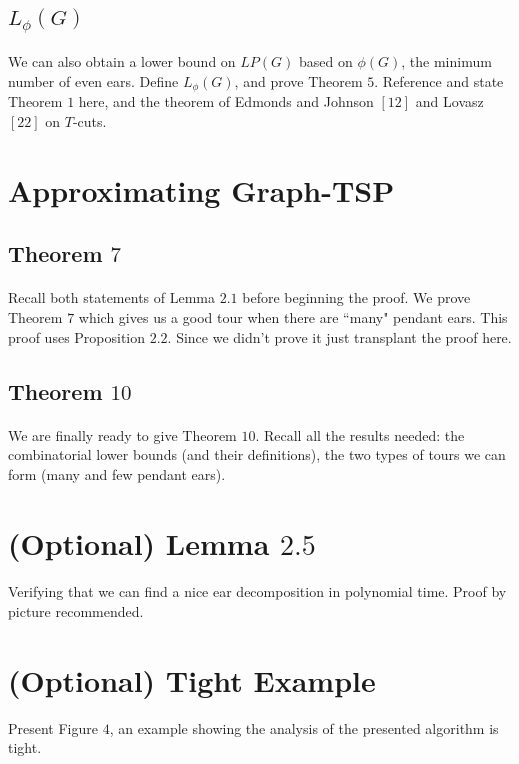 \documentclass[letterpaper,12pt,oneside,onecolumn]{article}
\begin{document}
\subsection{$L_\phi(G)$}
\paragraph{}
We can also obtain a lower bound on $LP(G)$ based on $\phi(G)$, the minimum number of even ears. Define $L_\phi(G)$, and prove Theorem $5$. Reference and state Theorem $1$ here, and the theorem of Edmonds and Johnson $[12]$ and Lovasz $[22]$ on $T$-cuts.
\section{Approximating Graph-TSP}
\subsection{Theorem $7$}
\paragraph{}
Recall both statements of Lemma $2.1$ before beginning the proof. We prove Theorem $7$ which gives us a good tour when there are ``many" pendant ears. This proof uses Proposition $2.2$. Since we didn't prove it just transplant the proof here.
\subsection{Theorem $10$}
\paragraph{}
We are finally ready to give Theorem $10$. Recall all the results needed: the combinatorial lower bounds (and their definitions), the two types of tours we can form (many and few pendant ears).
\section{(Optional) Lemma $2.5$}
\paragraph{}
Verifying that we can find a nice ear decomposition in polynomial time. Proof by picture recommended.
\section{(Optional) Tight Example}
Present Figure $4$, an example showing the analysis of the presented algorithm is tight.
\end{document}

